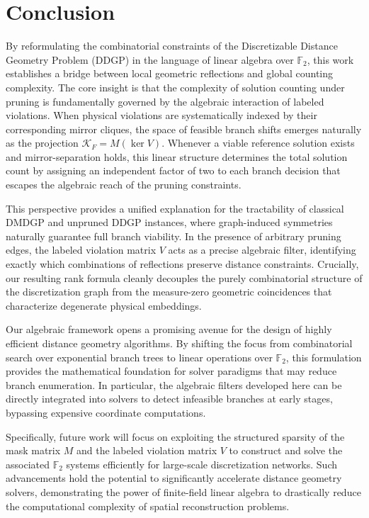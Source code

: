 \documentclass[11pt]{article}
\theoremstyle{plain}
\theoremstyle{definition}
\begin{document}
\section{Conclusion}
\label{sec:conclusion}

By reformulating the combinatorial constraints of the Discretizable Distance Geometry Problem (DDGP) in the language of linear algebra over $\mathbb{F}_2$, this work establishes a bridge between local geometric reflections and global counting complexity. The core insight is that the complexity of solution counting under pruning is fundamentally governed by the algebraic interaction of labeled violations. When physical violations are systematically indexed by their corresponding mirror cliques, the space of feasible branch shifts emerges naturally as the projection $\mathcal{K}_F = M(\ker V)$. Whenever a viable reference solution exists and mirror-separation holds, this linear structure determines the total solution count by assigning an independent factor of two to each branch decision that escapes the algebraic reach of the pruning constraints.

This perspective provides a unified explanation for the tractability of classical DMDGP and unpruned DDGP instances, where graph-induced symmetries naturally guarantee full branch viability. In the presence of arbitrary pruning edges, the labeled violation matrix $V$ acts as a precise algebraic filter, identifying exactly which combinations of reflections preserve distance constraints. Crucially, our resulting rank formula cleanly decouples the purely combinatorial structure of the discretization graph from the measure-zero geometric coincidences that characterize degenerate physical embeddings.

Our algebraic framework opens a promising avenue for the design of highly efficient distance geometry algorithms. By shifting the focus from combinatorial search over exponential branch trees to linear operations over $\mathbb{F}_2$, this formulation provides the mathematical foundation for solver paradigms that may reduce branch enumeration. In particular, the algebraic filters developed here can be directly integrated into solvers to detect infeasible branches at early stages, bypassing expensive coordinate computations.

Specifically, future work will focus on exploiting the structured sparsity of the mask matrix $M$ and the labeled violation matrix $V$ to construct and solve the associated $\mathbb{F}_2$ systems efficiently for large-scale discretization networks. Such advancements hold the potential to significantly accelerate distance geometry solvers, demonstrating the power of finite-field linear algebra to drastically reduce the computational complexity of spatial reconstruction problems.



\end{document}
